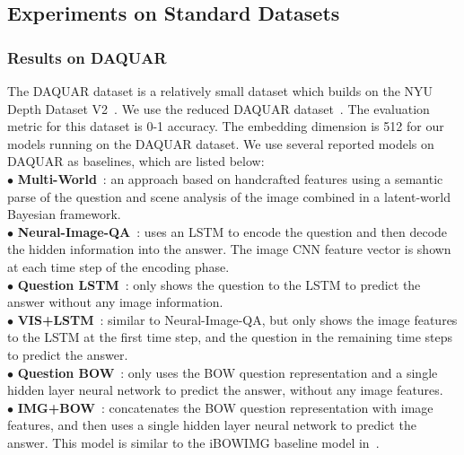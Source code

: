 \subsection{Experiments on Standard Datasets}\label{sec:expstandard}
\subsubsection{Results on DAQUAR}
The DAQUAR dataset is a relatively small dataset which builds on the NYU Depth Dataset V2~\cite{Silberman:ECCV12}. We use the reduced DAQUAR dataset~\cite{DBLP:journals/corr/MalinowskiF14}. The evaluation metric for this dataset is 0-1 accuracy. 
The embedding dimension is 512 for our models running on the DAQUAR dataset. 
We use several reported models on DAQUAR as baselines, which are listed below:\\
{$\bullet$} {\bf{Multi-World}}~\cite{DBLP:journals/corr/MalinowskiF14}: an approach based on handcrafted features using a semantic parse of the question and scene analysis of the image combined in a latent-world Bayesian framework.\\ 
{$\bullet$} {\bf{Neural-Image-QA}}~\cite{malinowski2015ask}: uses an LSTM to encode the question and then decode the hidden information into the answer. The image CNN feature vector is shown at each time step of the encoding phase.\\
{$\bullet$} {\bf{Question LSTM}}~\cite{malinowski2015ask}: only shows the question to the LSTM to predict the answer without any image information.\\
{$\bullet$} {\bf{VIS+LSTM}}~\cite{DBLP:journals/corr/RenKZ15}: similar to Neural-Image-QA, but only shows the image features to the LSTM at the first time step, and the question in the remaining time steps to predict the answer.\\
{$\bullet$} {\bf{Question BOW}}~\cite{DBLP:journals/corr/RenKZ15}: only uses the BOW question representation and a single hidden layer neural network to predict the answer, without any image features.\\
{$\bullet$} {\bf{IMG+BOW}}~\cite{DBLP:journals/corr/RenKZ15}: concatenates the BOW question representation with image features, and then uses a single hidden layer neural network to predict the answer. This model is similar to the iBOWIMG baseline model in~\cite{zhou2015simple}.

